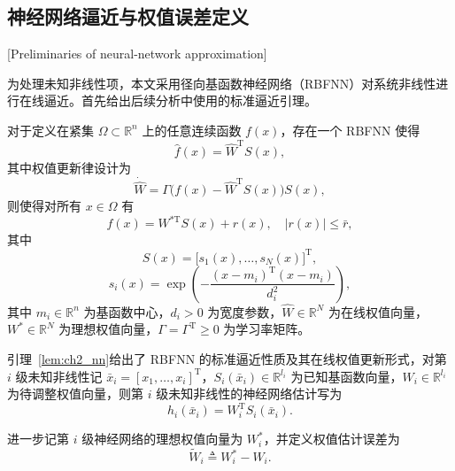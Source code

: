 \subsection{神经网络逼近与权值误差定义}[Preliminaries of neural-network approximation]

为处理未知非线性项，本文采用径向基函数神经网络（RBFNN）对系统非线性进行在线逼近。首先给出后续分析中使用的标准逼近引理。

\begin{lemma}\label{lem:ch2_nn}\hfill\cite{Sanner1992}
对于定义在紧集 $\Omega\subset\mathbb{R}^n$ 上的任意连续函数 $f(x)$，存在一个 RBFNN 使得
\begin{equation}\label{eq:ch2_rbf_approx}
  \hat f(x)=\hat W^{\mathrm T}S(x),
\end{equation}
其中权值更新律设计为
\begin{equation}\label{eq:ch2_rbf_update}
  \dot{\hat W}=\Gamma\big(f(x)-\hat W^{\mathrm T}S(x)\big)S(x),
\end{equation}
则使得对所有 $x\in\Omega$ 有
\begin{equation}\label{eq:ch2_rbf_error}
  f(x)=W^{\ast\mathrm T}S(x)+r(x),\quad |r(x)|\le \bar{r},
\end{equation}
其中
\begin{equation}\label{eq:ch2_rbf_basis}
  S(x)=\big[s_1(x),\ldots,s_N(x)\big]^{\mathrm T},
\end{equation}
\begin{equation}\label{eq:ch2_rbf_basis_i}
  s_i(x)=\exp\left(-\frac{(x-m_i)^{\mathrm T}(x-m_i)}{d_i^2}\right),
\end{equation}
其中 $m_i\in\mathbb{R}^n$ 为基函数中心，$d_i>0$ 为宽度参数，$\hat W\in\mathbb{R}^N$ 为在线权值向量，$W^\ast\in\mathbb{R}^N$ 为理想权值向量，$\Gamma=\Gamma^{\mathrm T}\ge 0$ 为学习率矩阵。
\end{lemma}

引理~\ref{lem:ch2_nn}给出了 RBFNN 的标准逼近性质及其在线权值更新形式，对第 $i$ 级未知非线性记 $\bar x_i=[x_1,\ldots,x_i]^{\mathrm T}$，$S_i(\bar x_i)\in\mathbb{R}^{l_i}$ 为已知基函数向量，$W_i\in\mathbb{R}^{l_i}$ 为待调整权值向量，则第 $i$ 级未知非线性的神经网络估计写为
\begin{equation}\label{eq:ch2_nn_general}
  h_i(\bar x_i)=W_i^{\mathrm T}S_i(\bar x_i).
\end{equation}

进一步记第 $i$ 级神经网络的理想权值向量为 $W_i^\ast$，并定义权值估计误差为
\begin{equation}\label{eq:ch2_weight_error}
  \tilde W_i\triangleq W_i^\ast-W_i.
\end{equation}

